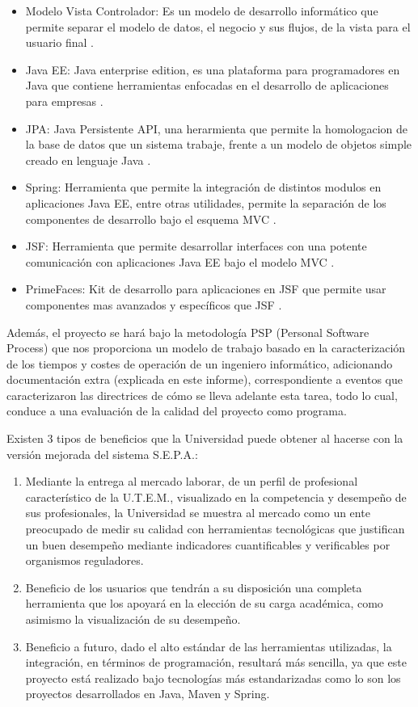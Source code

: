 \documentclass[a4paper,12pt,openany,oneside]{book}
\begin{document}
\begin{itemize}
	\item Modelo Vista Controlador: Es un modelo de desarrollo informático que permite separar el modelo de datos, el negocio y sus flujos, de la vista para el usuario final \cite{data12}.
	\item Java EE: Java enterprise edition, es una plataforma para programadores en Java que contiene herramientas enfocadas en el desarrollo de aplicaciones para empresas \cite{data14}.
	\item JPA: Java Persistente API, una herarmienta que permite la homologacion de la base de datos que un sistema trabaje, frente a un modelo de objetos simple creado en lenguaje Java \cite{data13}.
	\item Spring: Herramienta que permite la integración de distintos modulos en aplicaciones Java EE, entre otras utilidades, permite la separación de los componentes de desarrollo bajo el esquema MVC  \cite{data15}.
	\item JSF: Herramienta que permite desarrollar interfaces con una potente comunicación con aplicaciones Java EE bajo el modelo MVC \cite{data16}.
	\item PrimeFaces: Kit de desarrollo para aplicaciones en JSF que permite usar componentes mas avanzados y específicos que JSF \cite{data17}.
\end{itemize}

Además, el proyecto se hará bajo la metodología PSP (Personal Software Process) que nos proporciona un modelo de trabajo basado en la caracterización de los tiempos y costes de operación de un ingeniero informático, adicionando documentación extra (explicada en este informe), correspondiente a eventos que caracterizaron las directrices de cómo se lleva adelante esta tarea, todo lo cual, conduce a una evaluación de la calidad del proyecto como programa.

Existen 3 tipos de beneficios que la Universidad puede obtener al hacerse con la versión mejorada del sistema S.E.P.A.:

\begin{enumerate}
\item Mediante la entrega al mercado laborar, de un perfil de profesional característico de la U.T.E.M., visualizado en la competencia y desempeño de sus profesionales, la Universidad se muestra al mercado como un ente preocupado de medir su calidad con herramientas tecnológicas que justifican un buen desempeño mediante indicadores cuantificables y verificables por 
organismos reguladores.

\item Beneficio de los usuarios que tendrán a su disposición una completa herramienta que los apoyará en la elección de su carga académica, como asimismo la visualización de su desempeño.

\item Beneficio a futuro, dado el alto estándar de las herramientas utilizadas, la integración, en términos de programación, resultará más sencilla, ya que este proyecto está realizado bajo tecnologías más estandarizadas como lo son los proyectos desarrollados en Java, Maven y Spring.
\end{enumerate}
\end{document}
